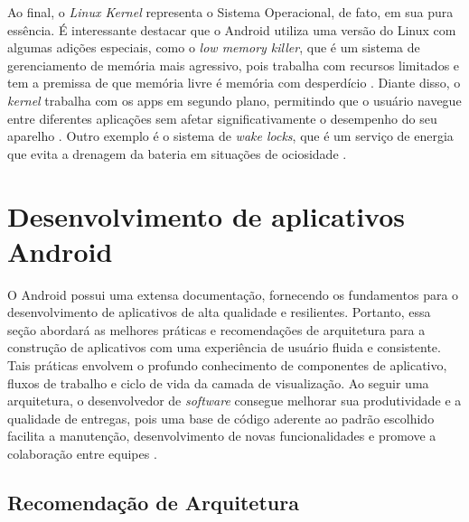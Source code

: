 Ao final, o \textit{Linux Kernel} representa o Sistema Operacional, de fato, em sua pura essência. É interessante destacar que o Android utiliza 
uma versão do Linux com algumas adições especiais, como o \textit{low memory killer}, que é um sistema de gerenciamento de memória mais agressivo, pois trabalha com recursos 
limitados e tem a premissa de que memória livre é memória com desperdício . Diante disso, o \textit{kernel} trabalha com os apps em segundo plano, permitindo que o usuário navegue 
entre diferentes aplicações sem afetar significativamente o desempenho do seu aparelho \cite{google-developers-memory-killer}. Outro exemplo é o sistema de \textit{wake locks}, que é um serviço de energia que evita 
a drenagem da bateria em situações de ociosidade \cite{google-developers-wakelock}.

\section{Desenvolvimento de aplicativos Android}

O Android possui uma extensa documentação, fornecendo os fundamentos para o desenvolvimento de 
aplicativos de alta qualidade e resilientes. Portanto, essa seção abordará as melhores práticas e recomendações
de arquitetura para a construção de aplicativos com uma experiência de usuário fluida e consistente. Tais práticas envolvem o profundo
conhecimento de componentes de aplicativo, fluxos de trabalho e ciclo de vida da camada de visualização. Ao seguir uma arquitetura, 
o desenvolvedor de \textit{software} consegue melhorar sua produtividade e a qualidade de entregas, pois uma base de código aderente ao 
padrão escolhido facilita a manutenção, desenvolvimento de novas funcionalidades e promove a colaboração entre equipes \cite{google-developers-guideline}.

\subsection{Recomendação de Arquitetura}

